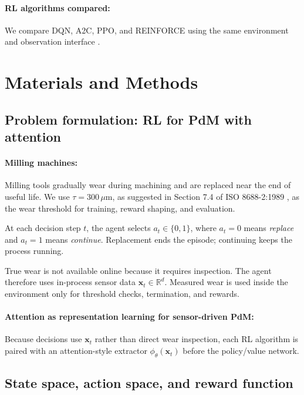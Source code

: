 \documentclass[sn-basic]{sn-jnl}%
\begin{document}
\paragraph{RL algorithms compared:}
We compare DQN, A2C, PPO, and \textsc{REINFORCE} using the same environment and observation interface \cite{Mnih2015, Schulman2017, Williams1992}.

\section{Materials and Methods}
\label{sec:method}

\subsection{Problem formulation: RL for PdM with attention}
\label{sec:env} \label{app:env_reward}
\paragraph{Milling machines:}
Milling tools gradually wear during machining and are replaced near the end of useful life. We use $\tau = 300\,\mu\mathrm{m}$, as suggested in Section 7.4 of ISO 8688-2:1989 \citep{ISO8688-2-1989}, as the wear threshold for training, reward shaping, and evaluation.

At each decision step $t$, the agent selects $a_t\in\{0,1\}$, where $a_t=0$ means \emph{replace} and $a_t=1$ means \emph{continue}. Replacement ends the episode; continuing keeps the process running.

True wear is not available online because it requires inspection. The agent therefore uses in-process sensor data $\mathbf{x}_t\in\mathbb{R}^d$. Measured wear is used inside the environment only for threshold checks, termination, and rewards.

\paragraph{Attention as representation learning for sensor-driven PdM:}
Because decisions use $\mathbf{x}_t$ rather than direct wear inspection, each RL algorithm is paired with an attention-style extractor $\phi_\theta(\mathbf{x}_t)$ before the policy/value network.

\subsection{State space, action space, and reward function}
\label{sec:mdp_components}
\end{document}
